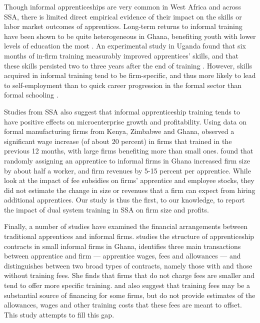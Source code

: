 \documentclass[
  a4paper, twoside, 12pt]{book}
\begin{document}
Though informal apprenticeships are very common in West Africa and across SSA, there is limited direct empirical evidence of their impact on the skills or labor market outcomes of apprentices. Long-term returns to informal training have been shown to be quite heterogeneous in Ghana, benefiting youth with lower levels of education the most \autocite{monk2008}. An experimental study in Uganda found that six months of in-firm training measurably improved apprentices' skills, and that these skills persisted two to three years after the end of training \autocite{alfonsi2020}. However, skills acquired in informal training tend to be firm-specific, and thus more likely to lead to self-employment than to quick career progression in the formal sector than formal schooling \autocite{frazer2006,hardy2019,alfonsi2020}.

Studies from SSA also suggest that informal apprenticeship training tends to have positive effects on microenterprise growth and profitability. Using data on formal manufacturing firms from Kenya, Zimbabwe and Ghana, \textcite{rosholm2007} observed a significant wage increase (of about 20 percent) in firms that trained in the previous 12 months, with large firms benefiting more than small ones. \textcite{hardy2022} found that randomly assigning an apprentice to informal firms in Ghana increased firm size by about half a worker, and firm revenues by 5-15 percent per apprentice. While \textcite{crepon2019} look at the impact of fee subsidies on firms' apprentice and employee stocks, they did not estimate the change in size or revenues that a firm can expect from hiring additional apprentices. Our study is thus the first, to our knowledge, to report the impact of dual system training in SSA on firm size and profits.

Finally, a number of studies have examined the financial arrangements between traditional apprentices and informal firms. \textcite{velenchik1995} studies the structure of apprenticeship contracts in small informal firms in Ghana, identifies three main transactions between apprentice and firm --- apprentice wages, fees and allowances --- and distinguishes between two broad types of contracts, namely those with and those without training fees. She finds that firms that do not charge fees are smaller and tend to offer more specific training. \textcite{velenchik1995} and \textcite{frazer2006} also suggest that training fees may be a substantial source of financing for some firms, but do not provide estimates of the allowances, wages and other training costs that these fees are meant to offset. This study attempts to fill this gap.
\end{document}
